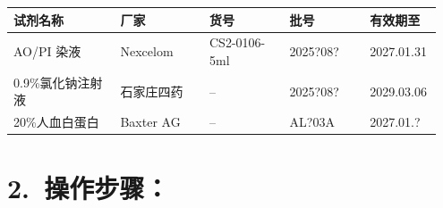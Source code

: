 \documentclass[UTF8,10pt,a4paper,fontset=fandol]{ctexart}
\newcommand{\fieldvalue}[1]{#1}
\newcommand{\handwritten}[1]{#1}
\begin{document}
\begin{center}
\small
\begin{tabular}{|p{0.24\linewidth}|p{0.20\linewidth}|p{0.18\linewidth}|p{0.18\linewidth}|p{0.15\linewidth}|}
\hline
试剂名称 & 厂家 & 货号 & 批号 & 有效期至\\
\hline
AO/PI 染液 &
\fieldvalue{Nexcelom} &
\fieldvalue{CS2-0106-5ml} &
\fieldvalue{\handwritten{2025?08?}} &
\fieldvalue{\handwritten{2027.01.31}}\\
\hline
0.9\%氯化钠注射液 &
\fieldvalue{石家庄四药} &
\fieldvalue{--} &
\fieldvalue{\handwritten{2025?08?}} &
\fieldvalue{\handwritten{2029.03.06}}\\
\hline
20\%人血白蛋白 &
\fieldvalue{Baxter AG} &
\fieldvalue{--} &
\fieldvalue{\handwritten{AL?03A}} &
\fieldvalue{\handwritten{2027.01.?}}\\
\hline
\end{tabular}
\end{center}

\section*{2.\ 操作步骤：}
\end{document}
